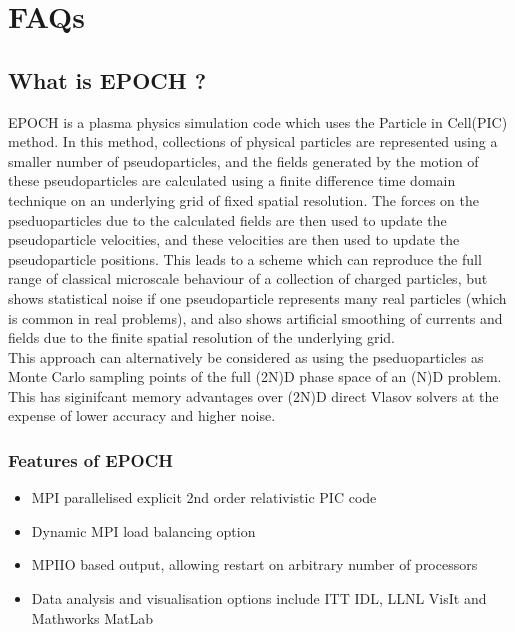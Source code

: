 \documentclass[12pt]{article}
\newcommand{\nEPOCH}{{\color{warwickdark}\fontfamily{phv}\selectfont EPOCH}}
\newcommand{\EPOCH}{{\nEPOCH} }
\begin{document}
{
  \selectfont
  
}
\selectfont
\tableofcontents
\newpage

\section{FAQs}

\subsection{What is \EPOCH?}
\EPOCH is a plasma physics simulation code which uses the Particle in Cell(PIC)
method. In this method, collections of physical particles are represented using
a smaller number of pseudoparticles, and the fields generated by the motion of
these pseudoparticles are calculated using a finite difference time domain
technique on an underlying grid of fixed spatial resolution. The forces on the
pseduoparticles due to the calculated fields are then used to update the
pseudoparticle velocities, and these velocities are then used to update the
pseudoparticle positions. This leads to a scheme which can reproduce the full
range of classical microscale behaviour of a collection of charged particles,
but shows statistical noise if one pseudoparticle represents many real
particles (which is common in real problems), and also shows artificial
smoothing of currents and fields due to the finite spatial resolution of the
underlying grid.\\

This approach can alternatively be considered as using the pseduoparticles as
Monte Carlo sampling points of the full (2N)D phase space of an (N)D
problem. This has siginifcant memory advantages over (2N)D direct Vlasov
solvers at the expense of lower accuracy and higher noise.

\subsubsection{Features of \EPOCH}
\begin{itemize}
  \item MPI parallelised explicit 2nd order relativistic PIC code
  \item Dynamic MPI load balancing option
  \item MPIIO based output, allowing restart on arbitrary number of processors
  \item Data analysis and visualisation options include ITT IDL, LLNL VisIt
    and Mathworks MatLab
\end{itemize}
\end{document}
